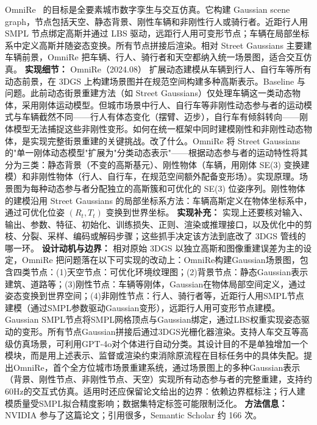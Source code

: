 OmniRe~\cite{2408_16760} 的目标是全要素城市数字孪生与交互仿真。它构建 Gaussian scene graph，节点包括天空、静态背景、刚性车辆和非刚性行人或骑行者。近距行人用 SMPL 节点绑定高斯并通过 LBS 驱动，远距行人用可变形节点；车辆在局部坐标系中定义高斯并随姿态变换。所有节点拼接后渲染。相对 Street Gaussians 主要建车辆前景，OmniRe 把车辆、行人、骑行者和天空都纳入统一场景图，适合交互仿真。
\textbf{实现细节：} OmniRe（2024.08） 扩展动态建模从车辆到行人、自行车等所有动态前景，在 3DGS 上构建场景图并在规范空间构建多种高斯表示。Baseline 与问题。此前动态街景重建方法（如 Street Gaussians）仅处理车辆这一类动态物体，采用刚体运动模型。但城市场景中行人、自行车等非刚性动态参与者的运动模式与车辆截然不同——行人有体态变化（摆臂、迈步），自行车有倾斜转向——刚体模型无法捕捉这些非刚性变形。如何在统一框架中同时建模刚性和非刚性动态物体，是实现完整街景重建的关键挑战。改了什么。OmniRe 将 Street Gaussians 的"单一刚体动态模型"扩展为"分类动态表示"——根据动态参与者的运动特性将其分为三类：静态背景（不变的高斯基元）、刚性物体（车辆，用刚体 SE(3) 变换建模）和非刚性物体（行人、自行车，在规范空间额外配备变形场）。实现原理。场景图为每种动态参与者分配独立的高斯簇和可优化的 SE(3) 位姿序列。刚性物体的建模沿用 Street Gaussians 的局部坐标系方法：车辆高斯定义在物体坐标系中，通过可优化位姿 $(R_t, T_t)$ 变换到世界坐标。
\textbf{实现补充：} 实现上还要核对输入、输出、参数、特征、初始化、训练损失、正则、渲染或推理接口，以及优化中的剪枝、分裂、采样、编码或解码步骤；这些抓手决定该方法到底改了 3DGS 管线的哪一环。
\textbf{设计动机与边界：} 相对原始 3DGS 以独立高斯和图像重建误差为主的设定，OmniRe 把问题落在以下可实现的改动上：OmniRe构建Gaussian场景图，包含四类节点：(1)天空节点：可优化环境纹理图；(2)背景节点：静态Gaussian表示建筑、道路等；(3)刚性节点：车辆等刚体，Gaussian在物体局部空间定义，通过姿态变换到世界空间；(4)非刚性节点：行人、骑行者等，近距行人用SMPL节点建模（通过SMPL参数驱动Gaussian变形），远距行人用可变形节点建模。Gaussian SMPL节点将SMPL网格顶点与Gaussian绑定，通过LBS权重实现姿态驱动的变形。所有节点Gaussian拼接后通过3DGS光栅化器渲染。支持人车交互等高级仿真场景，可利用GPT-4o对个体进行自动分类。其设计目的不是单独增加一个模块，而是用上述表示、监督或渲染约束消除原流程在目标任务中的具体失配。提出OmniRe，首个全方位城市场景重建系统，通过场景图上的多种Gaussian表示（背景、刚性节点、非刚性节点、天空）实现所有动态参与者的完整重建，支持约60Hz的交互式仿真。适用时还应保留论文给出的边界：依赖边界框标注；行人建模质量受SMPL拟合精度影响；数据集特定标签可能限制泛化。
\textbf{方法信息：} NVIDIA 参与了这篇论文；引用很多，Semantic Scholar 约 166 次。



